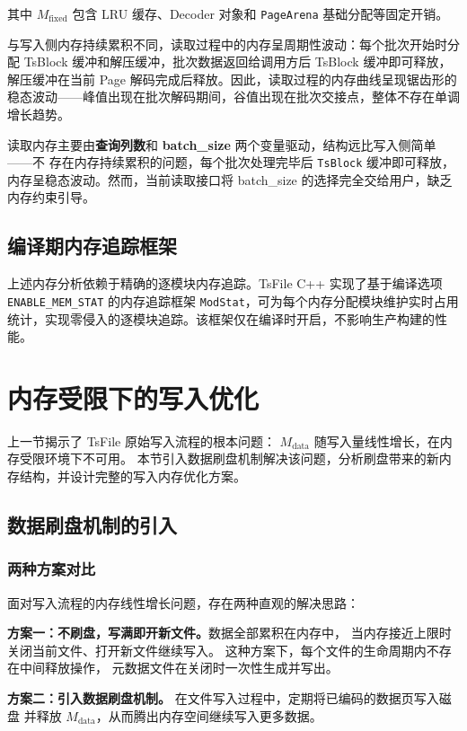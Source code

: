 其中 $M_{\text{fixed}}$ 包含 LRU 缓存、Decoder 对象和 \texttt{PageArena} 基础分配等固定开销。

与写入侧内存持续累积不同，读取过程中的内存呈周期性波动：每个批次开始时分配 TsBlock 缓冲和解压缓冲，批次数据返回给调用方后 TsBlock 缓冲即可释放，解压缓冲在当前 Page 解码完成后释放。因此，读取过程的内存曲线呈现锯齿形的稳态波动——峰值出现在批次解码期间，谷值出现在批次交接点，整体不存在单调增长趋势。

读取内存主要由\textbf{查询列数}和 
\textbf{batch\_size} 两个变量驱动，结构远比写入侧简单——不
存在内存持续累积的问题，每个批次处理完毕后 \texttt{TsBlock} 
缓冲即可释放，内存呈稳态波动。然而，当前读取接口将 batch\_size 的选择完全交给用户，缺乏内存约束引导。

\subsection{编译期内存追踪框架}
\label{subsec:modstat-framework}

上述内存分析依赖于精确的逐模块内存追踪。TsFile C++ 实现了基于编译选项 \texttt{ENABLE\_MEM\_STAT} 的内存追踪框架 \texttt{ModStat}，可为每个内存分配模块维护实时占用统计，实现零侵入的逐模块追踪。该框架仅在编译时开启，不影响生产构建的性能。


\section{内存受限下的写入优化}

上一节揭示了 TsFile 原始写入流程的根本问题：
$M_{\text{data}}$ 随写入量线性增长，在内存受限环境下不可用。
本节引入数据刷盘机制解决该问题，分析刷盘带来的新内存结构，并设计完整的写入内存优化方案。

\subsection{数据刷盘机制的引入}

\subsubsection{两种方案对比}

面对写入流程的内存线性增长问题，存在两种直观的解决思路：

\textbf{方案一：不刷盘，写满即开新文件。}数据全部累积在内存中，
当内存接近上限时关闭当前文件、打开新文件继续写入。
这种方案下，每个文件的生命周期内不存在中间释放操作，
元数据文件在关闭时一次性生成并写出。

\textbf{方案二：引入数据刷盘机制。}
在文件写入过程中，定期将已编码的数据页写入磁盘
并释放 $M_{\text{data}}$，从而腾出内存空间继续写入更多数据。

